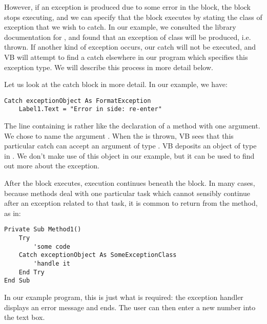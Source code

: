 		However, if an exception is produced due to some error in the  block, the  block stops executing, and we can specify that the  block executes by stating the class of exception that we wish to catch. In our example, we consulted the library documentation for , and found that an exception of class  will be produced, i.e. thrown. If another kind of exception occurs, our catch will not be executed, and VB will attempt to find a catch elsewhere in our program which specifies this exception type. We will describe this process in more detail below.
		
		Let us look at the catch block in more detail. In our example, we have:
		\begin{lstlisting}
Catch exceptionObject As FormatException
	Label1.Text = "Error in side: re-enter"
		\end{lstlisting}
		The line containing  is rather like the declaration of a method with one argument. We chose to name the argument . When the  is thrown, VB sees that this particular catch can accept an argument of type . VB deposits an object of type  in . We don't make use of this object in our example, but it can be used to find out more about the exception.
		
		After the  block executes, execution continues beneath the  block. In many cases, because methods deal with one particular task which cannot sensibly continue after an exception related to that task, it is common to return from the method, as in:
		\begin{lstlisting}
Private Sub Method1()
	Try
		'some code
	Catch exceptionObject As SomeExceptionClass
		'handle it
	End Try
End Sub
		\end{lstlisting}
		In our example program, this is just what is required: the exception handler displays an error message and ends. The user can then enter a new number into the text box.


